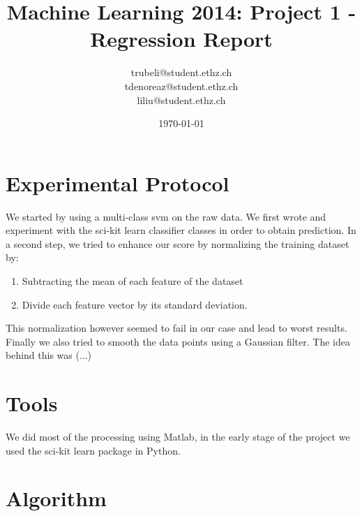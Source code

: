 \documentclass[a4paper, 11pt]{article}
\title{Machine Learning 2014: Project 1 - Regression Report}
\author{trubeli@student.ethz.ch\\ tdenoreaz@student.ethz.ch\\ liliu@student.ethz.ch\\}
\date{\today}
\begin{document}
\maketitle

\section*{Experimental Protocol}

We started by using a multi-class svm on the raw data. We first wrote and experiment with the sci-kit learn classifier classes in order to obtain prediction. In a second step, we tried to enhance our score by normalizing the training dataset by:

\begin{enumerate}
	\item Subtracting the mean of each feature of the dataset
	\item Divide each feature vector by its standard deviation.  
\end{enumerate}

This normalization however seemed to fail in our case and lead to worst results. Finally we also tried to smooth the data points using a Gaussian filter. The idea behind this was (...) 

\section{Tools}

We did most of the processing using Matlab, in the early stage of the project we used the sci-kit learn package in Python. 

\section{Algorithm}
\end{document}
